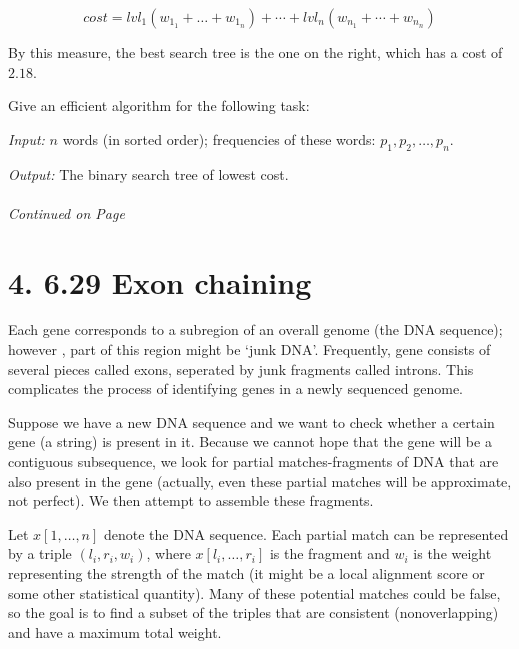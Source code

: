 \documentclass[11pt]{article}
\begin{document}
$$ cost = lvl_1(w_{1_1}+\ldots+w_{1_n}) + \cdots + lvl_n(w_{n_1}+\cdots+w_{n_n})$$

By this measure, the best search tree is the one on the right, which has a cost of $2.18$. 

Give an efficient algorithm for the following task:

\emph{Input:} $n$ words (in sorted order); frequencies of these words: $p_1,p_2,\ldots,p_n$.

\emph{Output:} The binary search tree of lowest cost.


\label{pg:end-of-p3}

%
 \paragraph{} \emph{Continued on Page \pageref{pg:p3-continuation}}

\newpage

\section*{4. 6.29 Exon chaining}

Each gene corresponds to a subregion of an overall genome (the DNA sequence); however
, part of this region might be `junk DNA'. Frequently, gene consists of 
several pieces called exons, seperated by junk fragments called introns. This complicates
the process of identifying genes in a newly sequenced genome.

Suppose we have a new DNA sequence and we want to check whether a certain gene (a string) 
is present in it. Because we cannot hope that the gene will be a contiguous subsequence,
we look for partial matches-fragments of DNA that are also present in the gene (actually, 
even these partial matches will be approximate, not perfect). We then attempt to assemble 
these fragments. 

Let $x[1,\ldots,n]$ denote the DNA sequence. Each partial match can be represented by a triple 
$(l_i,r_i,w_i)$, where $x[l_i,\ldots,r_i]$ is the fragment and $w_i$ is the weight representing 
the strength of the match (it might be a local alignment score or some other statistical 
quantity). Many of these potential matches could be false, so the goal is to find a subset
of the triples that are consistent (nonoverlapping) and have a maximum total weight.
\end{document}
